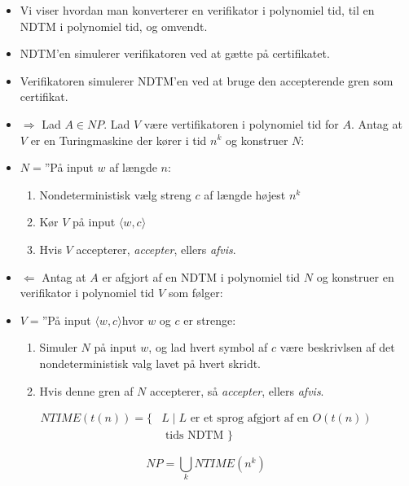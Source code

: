 \begin{frame}[allowframebreaks]
 \begin{itemize}
   \item Vi viser hvordan man konverterer en verifikator i polynomiel tid, til en NDTM i polynomiel tid, og omvendt.
   \item NDTM'en simulerer verifikatoren ved at gætte på certifikatet.
   \item Verifikatoren simulerer NDTM'en ved at bruge den accepterende gren som certifikat.
   \item \(\Rightarrow\) Lad $A \in NP$. Lad $V$ være vertifikatoren i polynomiel tid for $A$. Antag at $V$ er en Turingmaskine der kører i tid $n^{k}$ og konstruer $N$:
   \item $N =$''På input $w$ af længde $n$:
         \begin{enumerate}
           \item Nondeterministisk vælg streng $c$ af længde højest $n^{k}$
           \item Kør $V$ på input $\langle w, c \rangle $
           \item Hvis $V$ accepterer, \textit{accepter}, ellers \textit{afvis}.
         \end{enumerate}

   \item \(\Leftarrow\) Antag at $A$ er afgjort af en NDTM i polynomiel tid $N$ og konstruer en verifikator i polynomiel tid $V$ som følger:
   \item $V = $''På input \(\langle w, c \rangle  \)hvor $w$ og $c$ er strenge:
         \begin{enumerate}
           \item Simuler $N$ på input $w$, og lad hvert symbol af $c$ være beskrivlsen af det nondeterministisk valg lavet på hvert skridt.
           \item Hvis denne gren af $N$ accepterer, så \textit{accepter}, ellers \textit{afvis}.
         \end{enumerate}
 \end{itemize}

 \begin{definition}
\begin{align*}
NTIME(t(n)) = \{& L \mid L \text{ er et sprog afgjort af en } O(t(n)) \\ &\text{ tids NDTM }\}
\end{align*}
 \end{definition}

 \begin{corollary}
   \begin{equation}
     NP = \bigcup_k NTIME(n^{k})
   \end{equation}
 \end{corollary}
\end{frame}

